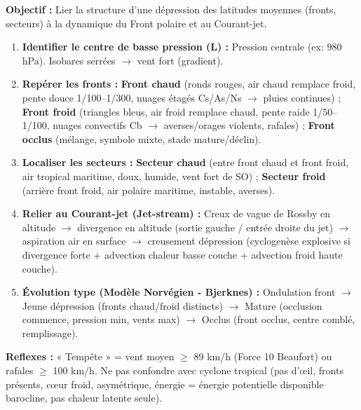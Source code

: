 \documentclass[11pt]{article}
\newcommand{\cle}[1]{{\popxbold\color{popdark}#1}}
\begin{document}

\begin{methode}
\textbf{Objectif :} Lier la structure d'une dépression des latitudes moyennes (fronts, secteurs) à la dynamique du \cle{Front polaire} et au \cle{Courant-jet}.
\begin{enumerate}
    \item \textbf{Identifier le centre de basse pression (L) :} Pression centrale (ex: 980 hPa). Isobares serrées $\to$ vent fort (gradient).
    \item \textbf{Repérer les fronts :} \textbf{Front chaud} (ronds rouges, air chaud remplace froid, pente douce 1/100--1/300, nuages étagés Cs/As/Ns $\to$ pluies continues) ; \textbf{Front froid} (triangles bleus, air froid remplace chaud, pente raide 1/50--1/100, nuages convectifs Cb $\to$ averses/orages violents, rafales) ; \textbf{Front occlus} (mélange, symbole mixte, stade mature/déclin).
    \item \textbf{Localiser les secteurs :} \textbf{Secteur chaud} (entre front chaud et front froid, air tropical maritime, doux, humide, vent fort de SO) ; \textbf{Secteur froid} (arrière front froid, air polaire maritime, instable, averses).
    \item \textbf{Relier au Courant-jet (Jet-stream) :} Creux de vague de Rossby en altitude $\to$ divergence en altitude (sortie gauche / entrée droite du jet) $\to$ aspiration air en surface $\to$ creusement dépression (cyclogenèse explosive si divergence forte + advection chaleur basse couche + advection froid haute couche).
    \item \textbf{Évolution type (Modèle Norvégien - Bjerknes) :} Ondulation front $\to$ Jeune dépression (fronts chaud/froid distincts) $\to$ Mature (occlusion commence, pression min, vents max) $\to$ Occlus (front occlus, centre comblé, remplissage).
\end{enumerate}
\textbf{Reflexes :} « Tempête » = vent moyen $\ge$ 89 km/h (Force 10 Beaufort) ou rafales $\ge$ 100 km/h. Ne pas confondre avec cyclone tropical (pas d'œil, fronts présents, cœur froid, asymétrique, énergie = énergie potentielle disponible barocline, pas chaleur latente seule).
\end{methode}
\end{document}
